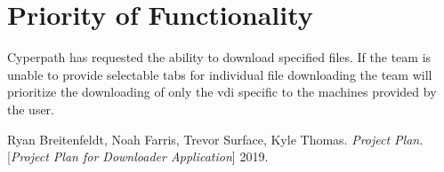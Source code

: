\documentclass{article}
\begin{document}
    \section{Priority of Functionality}
    Cyperpath has requested the ability to download specified files. If the team is unable to provide selectable tabs for individual file downloading the team will prioritize the downloading of only the vdi specific
    to the machines provided by the user.



    \newpage
    \begin{thebibliography}{1}
    Ryan Breitenfeldt, Noah Farris, Trevor Surface, Kyle Thomas.
    \textit{Project Plan}.
    [\textit{Project Plan for Downloader Application}] 2019.
    \end{thebibliography}



\end{document}
